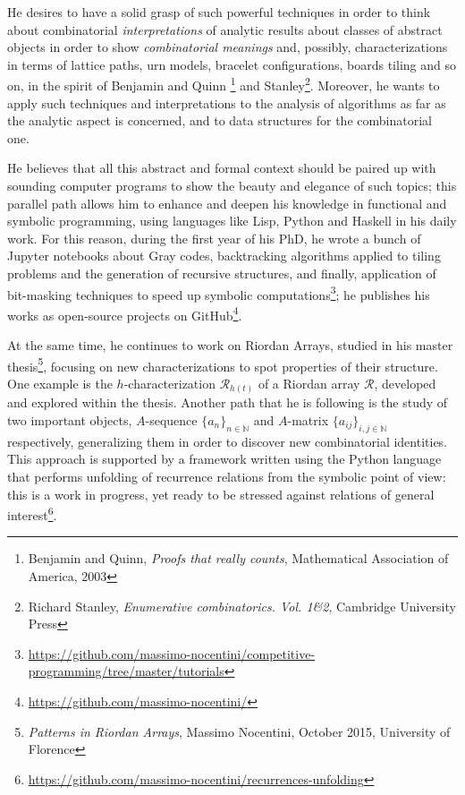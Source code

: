 \documentclass[10pt,a4paper]{scrartcl}
\begin{document}
    He desires to have a solid grasp of such powerful techniques in order to
    think about combinatorial \emph{interpretations} of
    analytic results about classes of abstract objects in order to show
    \emph{combinatorial meanings} and, possibly, characterizations in terms
    of lattice paths, urn models, bracelet configurations, boards
    tiling and so on, in the spirit of Benjamin and Quinn \footnote{Benjamin
    and Quinn, \emph{Proofs that really counts}, Mathematical Association of
    America, 2003} and Stanley\footnote{Richard Stanley, \emph{Enumerative
    combinatorics. {V}ol. 1\&2}, Cambridge University Press}. Moreover, he wants
    to apply such techniques and interpretations to the analysis of algorithms
    as far as the analytic aspect is concerned, and to data structures for the
    combinatorial one. 

    He believes that all this abstract and formal context should be paired up with
    sounding computer programs to show the beauty and elegance of such topics;
    this parallel path allows him to enhance and deepen his knowledge in functional
    and symbolic programming, using languages like Lisp, Python and Haskell in his daily work.
    For this reason, during the first year of his PhD, he wrote a bunch of Jupyter 
    notebooks about Gray codes, backtracking algorithms applied to tiling problems
    and the generation of recursive structures, and finally, application
    of bit-masking techniques to speed up symbolic computations\footnote{\url{https://github.com/massimo-nocentini/competitive-programming/tree/master/tutorials}};
    he publishes his works as open-source projects on GitHub\footnote{\url{https://github.com/massimo-nocentini/}}.

    At the same time, he continues to work on Riordan Arrays, studied in his
    master thesis\footnote{\textit{Patterns in Riordan Arrays}, Massimo Nocentini, October 2015, University of Florence}, 
    focusing on new characterizations to spot properties of their
    structure. One example is the $h$-characterization $\mathcal{R}_{h(t)}$ of a
    Riordan array $\mathcal{R}$, developed and explored within the thesis.
    Another path that he is following is the study of two important objects, $A$-sequence
    $\lbrace a_{n}\rbrace_{n\in\mathbb{N}}$ and $A$-matrix $\lbrace
    a_{ij}\rbrace_{i,j\in\mathbb{N}}$ respectively, generalizing them in order to
    discover new combinatorial identities. This approach is supported by a framework
    written using the Python language that performs unfolding of recurrence relations
    from the symbolic point of view: this is a work in progress, yet ready
    to be stressed against relations of general interest\footnote{\url{https://github.com/massimo-nocentini/recurrences-unfolding}}.
\end{document}
